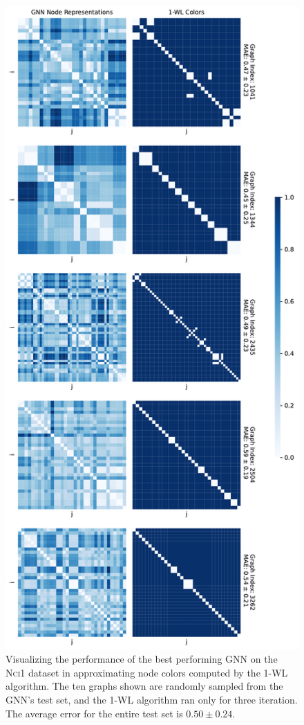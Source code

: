 \begin{figure}[!ht]
\begin{minipage}[b]{0.45992852703\textwidth}
    \end{minipage}
    \hfill
    \begin{minipage}[b]{0.53007147296\textwidth}
        \includegraphics[width=\textwidth, right]{Figures/heatmaps_NCI1_1.pdf}
    \end{minipage}
    \hfill
    \caption{Visualizing the performance of the best performing GNN on the \textsc{Nci1} dataset in approximating node colors computed by the 1-WL algorithm. The ten graphs shown are randomly sampled from the GNN's test set, and the 1-WL algorithm ran only for three iteration. The average error for the entire test set is $0.50 \pm 0.24$.}
\end{figure}

